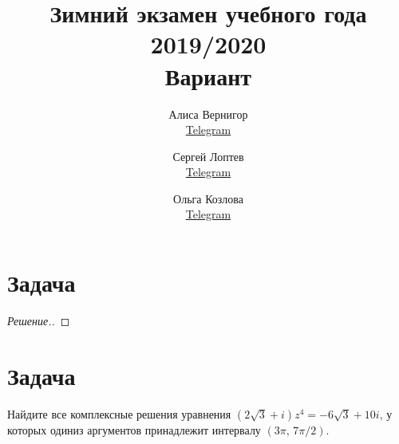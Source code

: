 \documentclass[a4paper]{article}
\title{Зимний экзамен учебного года 2019/2020\\Вариант \textnumero 1}
\author{	
    Алиса Вернигор       \\ \href{https://t.me/allisyonok}{Telegram} \and
	Сергей Лоптев        \\ \href{https://t.me/beast_sl}{Telegram} \and
	Ольга Козлова        \\ \href{https://t.me/grenlayk}{Telegram}
}
\date{}
\theoremstyle{remark}
\begin{document}
	\maketitle
    \section*{Задача }
      \begin{proof}[Решение.]
		
      \end{proof}	 
    
    \section*{Задача }
      Найдите все комплексные решения уравнения $(2\sqrt{3} + i)z^4 = - 6\sqrt{3} + 10i$, у которых одиниз аргументов принадлежит интервалу $(3\pi,\, 7\pi/2)$.
\end{document}
